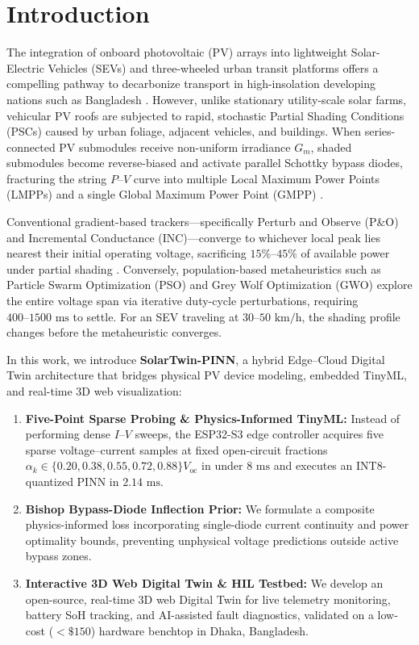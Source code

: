 \documentclass[final,3p,times,twocolumn]{elsarticle}
\begin{document}
\section{Introduction}
The integration of onboard photovoltaic (PV) arrays into lightweight Solar-Electric Vehicles (SEVs) and three-wheeled urban transit platforms offers a compelling pathway to decarbonize transport in high-insolation developing nations such as Bangladesh \cite{b1,b2}. However, unlike stationary utility-scale solar farms, vehicular PV roofs are subjected to rapid, stochastic Partial Shading Conditions (PSCs) caused by urban foliage, adjacent vehicles, and buildings. When series-connected PV submodules receive non-uniform irradiance $G_m$, shaded submodules become reverse-biased and activate parallel Schottky bypass diodes, fracturing the string $P\text{--}V$ curve into multiple Local Maximum Power Points (LMPPs) and a single Global Maximum Power Point (GMPP) \cite{b3}.

Conventional gradient-based trackers—specifically Perturb and Observe (P\&O) and Incremental Conductance (INC)—converge to whichever local peak lies nearest their initial operating voltage, sacrificing $15\%\text{--}45\%$ of available power under partial shading \cite{b4}. Conversely, population-based metaheuristics such as Particle Swarm Optimization (PSO) \cite{b5} and Grey Wolf Optimization (GWO) \cite{b6} explore the entire voltage span via iterative duty-cycle perturbations, requiring $400\text{--}1500\text{ ms}$ to settle. For an SEV traveling at $30\text{--}50\text{ km/h}$, the shading profile changes before the metaheuristic converges.

In this work, we introduce \textbf{SolarTwin-PINN}, a hybrid Edge--Cloud Digital Twin architecture that bridges physical PV device modeling, embedded TinyML, and real-time 3D web visualization:
\begin{enumerate}
    \item \textbf{Five-Point Sparse Probing \& Physics-Informed TinyML:} Instead of performing dense $I\text{--}V$ sweeps, the ESP32-S3 edge controller acquires five sparse voltage--current samples at fixed open-circuit fractions $\alpha_k \in \{0.20, 0.38, 0.55, 0.72, 0.88\}V_{\text{oc}}$ in under $8\text{ ms}$ and executes an INT8-quantized PINN in $2.14\text{ ms}$.
    \item \textbf{Bishop Bypass-Diode Inflection Prior:} We formulate a composite physics-informed loss incorporating single-diode current continuity and power optimality bounds, preventing unphysical voltage predictions outside active bypass zones.
    \item \textbf{Interactive 3D Web Digital Twin \& HIL Testbed:} We develop an open-source, real-time 3D web Digital Twin for live telemetry monitoring, battery SoH tracking, and AI-assisted fault diagnostics, validated on a low-cost ($<\$150$) hardware benchtop in Dhaka, Bangladesh.
\end{enumerate}
\end{document}
